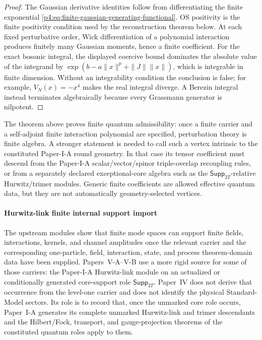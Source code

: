 \documentclass[12pt,a4paper]{article}
\begin{document}
\begin{proof}
The Gaussian derivative identities follow from differentiating the finite
exponential \eqref{p4:eq:finite-gaussian-generating-functional}.  OS
positivity is the finite positivity condition used by the reconstruction
theorem below.  At each fixed perturbative order, Wick differentiation of a
polynomial interaction produces finitely many Gaussian moments, hence a
finite coefficient.  For the exact bosonic integral, the displayed coercive
bound dominates the absolute value of the integrand by
\(\exp(b-a\|x\|^p+\|J\|\|x\|)\), which is integrable in finite dimension.
Without an integrability condition the conclusion is false; for example,
\(V_N(x)=-x^4\) makes the real integral diverge.  A Berezin integral instead
terminates algebraically because every Grassmann generator is nilpotent.
\end{proof}

\begin{remark}
\label{p4:rem:finite-interaction-versus-geometric-vertex}
The theorem above proves finite quantum admissibility: once a finite carrier and a
self-adjoint finite interaction polynomial are specified, perturbation theory is
finite algebra.  A stronger statement is needed to call such a vertex
intrinsic to the constituted Paper-I-A round geometry.  In that case its
tensor coefficient must descend
from the Paper-I-A scalar/vector/spinor triple-overlap recoupling rules, or from a
separately declared exceptional-core algebra such as the
\(\mathsf{Supp}_{2T}\)-relative Hurwitz/trimer modules.
Generic finite coefficients are allowed effective quantum data, but they are not
automatically geometry-selected vertices.
\end{remark}


\paragraph{Hurwitz-link finite internal support import}
\label{p4:sec:hurwitz-link-finite-internal-support}

The upstream modules show that finite mode spaces can support finite fields,
interactions, kernels, and channel amplitudes once the relevant carrier and
the corresponding one-particle, field, interaction, state, and process
theorem-domain data have been supplied.
Papers~V-A--V-B \cite{Kugelmann2026f,Kugelmann2026g} use a more rigid source for
some of those carriers: the Paper-I-A Hurwitz-link module on an actualized or
conditionally generated core-support role \(\mathsf{Supp}_{2T}\).
Paper~IV does not derive that occurrence from the level-one carrier and does
not identify the physical Standard-Model sectors.  Its role is to record
that, once the unmarked core role occurs, Paper~I-A generates its complete
unmarked Hurwitz-link and trimer descendants and the Hilbert/Fock, transport,
and gauge-projection theorems of the constituted quantum roles apply to them.
\end{document}
